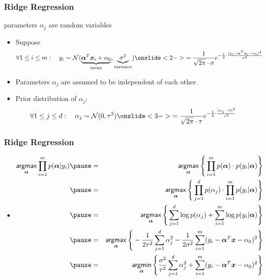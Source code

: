 \begin{frame}
	\frametitle{Ridge Regression \cont}

	 parameters $\alpha_j$ are random variables \\[.5cm]

	\begin{itemize}
		\item Suppose
		      \begin{displaymath}
			      \forall 1 \le i \le m: \quad y_i
			      \sim \mathcal{N}(\underbrace{\vec{\alpha}^T \vec{x}_i + \alpha_0}_\text{mean}, \underbrace{\sigma^2}_\text{variance})
			      \onslide<2->{
				      = \frac{1}{\sqrt{2 \pi} \cdot \sigma} e^{-\frac{1}{2} \cdot \frac{(y_i - \vec{\alpha}^T \vec{x}_i - \alpha_0)^2}{\sigma^2}}
			      }
		      \end{displaymath}
		\item Parameters $\alpha_j$ are assumed to be independent of each other.
		\item Prior distribution of $\alpha_j$:
		      \begin{displaymath}
			      \forall 1 \le j \le d: \quad \alpha_j
			      \sim \mathcal{N}(0, \tau^2)
			      \onslide<3->{
				      = \frac{1}{\sqrt{2 \pi} \cdot \tau} e^{-\frac{1}{2} \cdot \frac{(\alpha_j - 0)^2}{\tau^2}}
			      }
		      \end{displaymath}
	\end{itemize}
\end{frame}


\begin{frame}
	\frametitle{Ridge Regression \cont}

	\begin{itemize}
		\item {}
		      \footnotesize
		      \begin{eqnarray*}
			      \argmax_{\vec{\alpha}} \prod_{i=1}^m p(\vec{\alpha}|y_i) \pause
			      &=& \argmax_{\vec{\alpha}} \Bigg\{ \prod_{i=1}^m p(\vec{\alpha}) \cdot p(y_i | \vec{\alpha}) \Bigg\} \\ \pause
			      &=& \argmax_{\vec{\alpha}} \Bigg\{ \prod_{j=1}^d p(\alpha_j) \cdot \prod_{i=1}^m p(y_i | \vec{\alpha}) \Bigg\} \\ \pause
			      &=& \argmax_{\vec{\alpha}} \Bigg\{ \sum_{j=1}^d \log p(\alpha_j) + \sum_{i=1}^m \log p(y_i | \vec{\alpha}) \Bigg\} \\ \pause
			      &=& \argmax_{\vec{\alpha}} \Bigg\{ - \frac{1}{2 \tau^2} \sum_{j=1}^d \alpha_j^2 - \frac{1}{2 \sigma^2} \sum_{i=1}^m (y_i - \vec{\alpha}^T \vec{x} - \alpha_0)^2 \Bigg\} \\ \pause
			      &=& \argmin_{\vec{\alpha}} \Bigg\{ \frac{\sigma^2}{\tau^2} \sum_{j=1}^d \alpha_j^2 + \sum_{i=1}^m (y_i - \vec{\alpha}^T \vec{x} - \alpha_0)^2 \Bigg\}
		      \end{eqnarray*}
	\end{itemize}
\end{frame}


